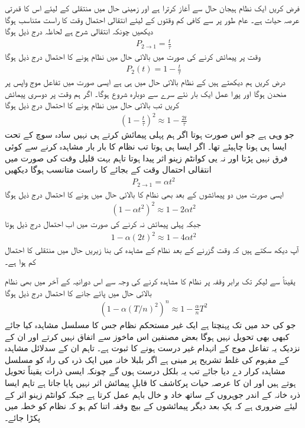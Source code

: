 فرض کریں ایک نظام ہیجان حال  سے آغاز کرترا ہے اور زمینی حال  میں منتقلی کے لیئے اس کا قدرتی عرصہ حیات  ہے۔ عام طور پر  سے کافی کم وقتوں کے لیئے انتقالی احتمال وقت  کا راست متناسب ہوگا  دیکھیں چونکہ انتقالی شرح  ہے لحاظہ درج ذیل ہوگا 
\begin{align}
	P_{2\to1}=\frac{t}{\tau}
\end{align}
وقت  پر پیمائش کرنے کی صورت میں بالائی حال میں نظام ہونے کا احتمال درج ذیل ہوگا
\begin{align}
	P_2(t)=1-\frac{t}{\tau}
\end{align}
درض کریں ہم دیکھتے ہیں کے نظام بالائی حال میں ہی ہے ایسی صورت میں تفاعل موج واپس  پر منحدن ہوگا اور پورا عمل ایک بار نئے سرے سے دوبارہ شروع ہوگا۔ اگر ہم وقت  پر دوسری پیمائش کریں تب بالائی حال میں نظام ہونے کا احتمال درج ذیل ہوگا 
\begin{align}
	\left(1-\frac{t}{\tau}\right)^2\approx1-\frac{2t}{\tau}
\end{align}
جو وہی ہے جو اس صورت ہوتا اگر ہم پہلی پیمائش کرتے ہی نہیں سادہ سوچ کے تحت ایسا ہی ہونا چاہیئے تھا۔ اگر ایسا ہی ہوتا تب نظام کا بار بار مشاہدہ کرنے سے کوئی فرق نہیں پڑتا اور نہ یی کوانٹم زینو اثر پیدا ہوتا تاہم بہت قلیل وقت کی صورت میں انتقالی احتمال وقت  کے بجائے  کا راست متانسب ہوگا  دیکھیں
\begin{align}
	P_{2\to1}=\alpha t^2
\end{align}
ایسی صورت میں دو پیمائشوں کے بعد بھی نظام کا بالائی حال میں ہونے کا احتمال درج ذیل ہوگا
\begin{align}
	\left(1-\alpha t^2\right)^2\approx 1-2\alpha t^2
\end{align}
جبکہ پہلی پیمائش نہ کرنے کی صورت میں اب احتمال درج ذیل ہوتا
\begin{align}
	1-\alpha(2t)^2\approx1-4\alpha t^2
\end{align}
آپ دیکھ سکتے ہیں کہ وقت  گزرنے کے بعد نظام کے مشاہدہ کی بنا زیریں حال میں منتقلی کا احتمال کم ہوا ہے۔

یقیناً  سے لیکر  تک  برابر وقفہ  پر نظام کا مشاہدہ کرنے کی وجہ سے اس دورانیہ کے آخر میں بھی نظام بالائی حال میں پائے جانے کا احتمال درج ذیل ہوگا
\begin{align}
	\left(1-\alpha(T/n)^2\right)^n\approx1-\frac{\alpha}{n}T^2
\end{align}
جو  کی حد میں  تک پہنچتا ہے ایک غیر مستحکم نظام جس کا مسلسل مشاہدہ کیا جائے کبھی بھی تحویل نہیں ہوگا بعض مصنفین اس ماخوز سے اتفاق نہیں کرتے اور ان کے نزدیک یہ تفاعل موج کے انہدام غیر درست ہونے کا ثبوت ہے۔ تاہم ان کے سدلائل مشاہدہ کے مفہوم کی غلط تشریح پر مبنی ہے اگر بلبلا خانہ میں ایک ذرہ کی راہ کو مسلسل مشاہدہ کرار دے دیا جائے تب یہ بلکل درست ہوں گے چونکہ ایسی ذرات یقیناً تحویل ہوتے ہیں اور ان کا عرصہ حیات پرکاشف کا قابلِ پیمائش اثر نہیں پایا جاتا ہے تاہم ایسا ذرہ خانہ کے اندر جوہروں کے ساتھ خاد و خال  باہم عمل کرتا ہے جبکہ کوانٹم زینو اثر کے لیئے ضروری ہے کہ یکِ بعد دیگر پیمائشوں کے بیچ وقفہ اتنا کم ہو کہ نظام کو  خطہ میں پکڑا جائے۔

